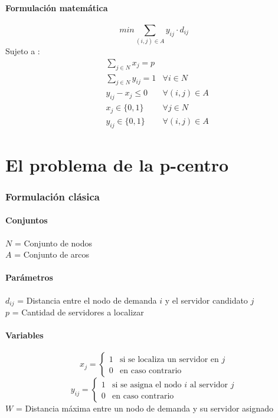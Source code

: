 \documentclass{article}
\numberwithin{equation}{section}
\begin{document}
\subsection{Formulación matemática}
\begin{equation}
min \sum_{(i,j) \in A} y_{ij} \cdot d_{ij}
\end{equation}
Sujeto a : \begin{align}
& \sum_{j \in N} x_{j} = p \\
& \sum_{j \in N} y_{ij} = 1 &\forall i \in N \\
& y_{ij} - x_{j} \leq 0 &\forall (i,j) \in A \\
& x_{j} \in \{0,1\} &\forall j \in N\\
& y_{ij} \in \{0,1\} &\forall (i,j) \in A
\end{align}

\part{El problema de la p-centro}
\section{Formulación clásica}
\subsection{Conjuntos}
$N$ = Conjunto de nodos\\
$A$ = Conjunto de arcos
\subsection{Parámetros}
$d_{ij}$ = Distancia entre el nodo de demanda $i$ y el servidor candidato $j$\\
$p$ = Cantidad de servidores a localizar
\subsection{Variables}
\begin{center}
\[x_{j}={\begin{cases}1&{\mbox{si se localiza un servidor en $j$}}\\0&{\mbox{en caso contrario}}\end{cases}}
\]
\[y_{ij}={\begin{cases}1&{\mbox{si se asigna el nodo $i$ al servidor $j$}}\\0&{\mbox{en caso contrario}}\end{cases}}
\]
$W$ = Distancia máxima entre un nodo de demanda y su servidor asignado
\end{center}
\end{document}
